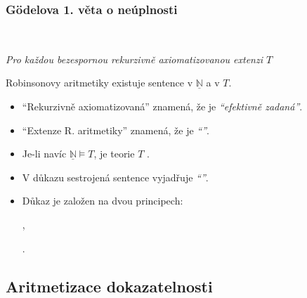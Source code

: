 \subsubsection*{Gödelova 1. věta o neúplnosti}
    \ \ {\it Pro každou bezespornou rekurzivně axiomatizovanou extenzi $T$

    
    Robinsonovy aritmetiky existuje sentence  v $\underline{\mathbb{N}}$ a  v $T$.}
    \medskip
    
    \smallskip
    
    {\it {}
    
    \begin{itemize}
    \item ``Rekurzivně axiomatizovaná'' znamená, že je \emph{``efektivně zadaná''}.
    \smallskip
    
    \item ``Extenze R. aritmetiky'' znamená, že je \emph{``''}.
    \smallskip
    
    \item Je-li navíc $\underline{\mathbb{N}}\models T$, je teorie $T$ .
    \smallskip
    
    \item V důkazu sestrojená sentence vyjadřuje \emph{``''}.
    \smallskip
    
    \item Důkaz je založen na dvou principech:
    \medskip
    
    ,
    \medskip
    
    .
    \end{itemize}}
    
    

    \subsection*{Aritmetizace dokazatelnosti}
